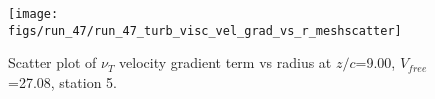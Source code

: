 \begin{figure}[H]
\centering
\texttt{[image: figs/run\_47/run\_47\_turb\_visc\_vel\_grad\_vs\_r\_meshscatter]}
\caption{Scatter plot of $\nu_T$ velocity gradient term vs radius at $z/c$=9.00, $V_{free}$=27.08, station 5.}
\label{fig:run_47_turb_visc_vel_grad_vs_r_meshscatter}
\end{figure}


